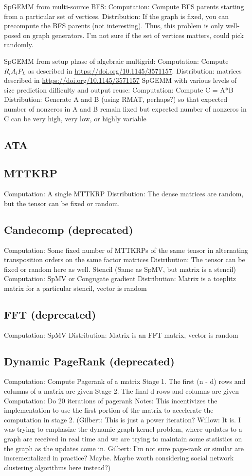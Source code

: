 \documentclass{article}
\begin{document}
SpGEMM from multi-source BFS:
	Computation: Compute BFS parents starting from a particular set of vertices.
	Distribution: If the graph is fixed, you can precompute the BFS parents (not interesting). Thus, this problem is only well-posed on graph generators. I’m not sure if the set of vertices matters, could pick randomly.

SpGEMM from setup phase of algebraic multigrid:
	Computation: Compute $R_lA_lP_L$ as described in \url{https://doi.org/10.1145/3571157}.
	Distribution: matrices described in \url{https://doi.org/10.1145/3571157}
SpGEMM with various levels of size prediction difficulty and output reuse:
	Computation: Compute C = A*B
	Distribution: Generate A and B (using RMAT, perhaps?) so that expected number of nonzeros in A and B remain fixed but expected number of nonzeros in C can be very high, very low, or highly variable

\subsection{ATA}

\subsection{MTTKRP}
	Computation: A single MTTKRP 
	Distribution: The dense matrices are random, but the tensor can be fixed or random.


\subsection{Candecomp (deprecated)}
	Computation: Some fixed number of MTTKRPs of the same tensor in alternating transposition orders on the same factor matrices
	Distribution: The tensor can be fixed or random here as well.
Stencil (Same as SpMV, but matrix is a stencil)
	Computation: SpMV or Congugate gradient
	Distribution: Matrix is a toeplitz matrix for a particular stencil, vector is random

\subsection{FFT (deprecated)}
	Computation: SpMV
	Distribution: Matrix is an FFT matrix, vector is random

\subsection{Dynamic PageRank (deprecated)}
	Computation: Compute Pagerank of a matrix
	Stage 1.
		The first (n - d) rows and columns of a matrix are given
	Stage 2.
		The final d rows and columns are given
	Computation:
		Do 20 iterations of pagerank
	Notes: This incentivizes the implementation to use the first portion of the matrix to accelerate the computation in stage 2.
(Gilbert: This is just a power iteration? Willow: It is. I was trying to emphasize the dynamic graph kernel problem, where updates to a graph are received in real time and we are trying to maintain some statistics on the graph as the updates come in. Gilbert: I'm not sure page-rank or similar are incrementalized in practice?  Maybe.  Maybe worth considering social network clustering algorithms here instead?)
\end{document}
